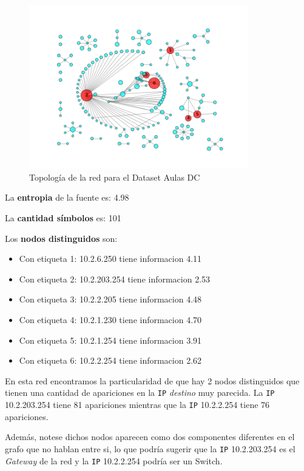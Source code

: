 \begin{figure}[H]
    \centering
    \includegraphics[width=0.85\textwidth]{imagenes/aulasDC.png}
    \caption{Topología de la red para el Dataset Aulas DC}
\end{figure}

La \textbf{entropia} de la fuente es: 4.98

La \textbf{cantidad símbolos} es: 101

Los \textbf{nodos distinguidos} son:

\begin{itemize}
    \item Con etiqueta 1: 10.2.6.250 tiene informacion 4.11
    \item Con etiqueta 2: 10.2.203.254 tiene informacion 2.53
    \item Con etiqueta 3: 10.2.2.205 tiene informacion 4.48
    \item Con etiqueta 4: 10.2.1.230 tiene informacion 4.70
    \item Con etiqueta 5: 10.2.1.254 tiene informacion 3.91
    \item Con etiqueta 6: 10.2.2.254 tiene informacion 2.62
\end{itemize}

En esta red encontramos la particularidad de que hay 2 nodos distinguidos que tienen
una cantidad de apariciones en la \texttt{IP} \textit{destino} muy parecida.
La \texttt{IP} 10.2.203.254 tiene 81 apariciones mientras que la \texttt{IP} 10.2.2.254 tiene 76 apariciones.

Además, notese dichos nodos aparecen como dos componentes diferentes en el grafo que no hablan entre si,
lo que podría sugerir que la \texttt{IP} 10.2.203.254 es el \textit{Gateway} de la red
y la \texttt{IP} 10.2.2.254 podría ser un Switch.

